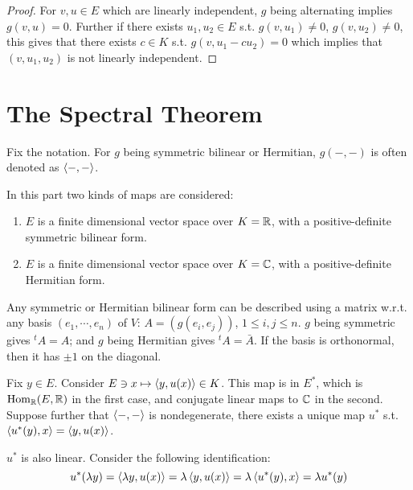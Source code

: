 \begin{proof}
    For $v, u \in E$ which are linearly independent, $g$ being alternating implies $g(v, u) = 0$. Further if there exists $u_1, u_2 \in E$ s.t. $g(v, u_1)\neq 0$, $g(v, u_2) \neq 0$, this gives that there exists $c \in K$ s.t. $g(v, u_1 - c u_2) = 0$ which implies that $(v, u_1, u_2)$ is not linearly independent.
\end{proof}

\section{The Spectral Theorem}

\begin{remark}
    Fix the notation. For $g$ being symmetric bilinear or Hermitian, $g(-, -)$ is often denoted as $\left\langle -, - \right\rangle$.
\end{remark}

In this part two kinds of maps are considered:
\begin{enumerate}
    \item $E$ is a finite dimensional vector space over $K = \mathbb{R}$, with a positive-definite symmetric bilinear form.
    \item $E$ is a finite dimensional vector space over $K = \mathbb{C}$, with a positive-definite Hermitian form.
\end{enumerate}

\begin{remark}
    Any symmetric or Hermitian bilinear form can be described using a matrix w.r.t. any basis $(e_1, \cdots, e_n)$ of $V$: $A = (g(e_i, e_j))$, $1 \leq i, j \leq n$. $g$ being symmetric gives $^t A = A$; and $g$ being Hermitian gives $^t A = \bar{A}$. If the basis is orthonormal, then it has $\pm 1$ on the diagonal.
\end{remark}

\begin{definition}
    Fix $y \in E$. Consider $E \ni x \mapsto \left\langle y, u(x) \right\rangle \in K$. This map is in $E^{\ast}$, which is $\mathrm{Hom}_{\mathbb{R}}(E, \mathbb{R})$ in the first case, and conjugate linear maps to $\mathbb{C}$ in the second. Suppose further that $\left\langle -, - \right\rangle$ is nondegenerate, there exists a unique map $u^{\ast}$ s.t. $\left\langle u^{\ast}(y), x \right\rangle = \left\langle y, u(x) \right\rangle$.
\end{definition}

\begin{remark}
    $u^{\ast}$ is also linear. Consider the following identification:
    \[
        u^{\ast}(\lambda y) = \left\langle \lambda y, u(x) \right\rangle = \lambda \left\langle y, u(x) \right\rangle = \lambda \left\langle u^{\ast}(y), x \right\rangle = \lambda u^{\ast}(y)
    \]
\end{remark}

